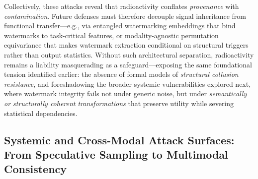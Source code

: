 \documentclass[11pt,a4paper]{article}
\begin{document}
Collectively, these attacks reveal that radioactivity conflates \emph{provenance} with \emph{contamination}. Future defenses must therefore decouple signal inheritance from functional transfer---e.g., via entangled watermarking embeddings \cite{arxiv:2002.12200} that bind watermarks to task-critical features, or modality-agnostic permutation equivariance \cite{arxiv:1910.12366} that makes watermark extraction conditional on structural triggers rather than output statistics. Without such architectural separation, radioactivity remains a liability masquerading as a safeguard---exposing the same foundational tension identified earlier: the absence of formal models of \emph{structural collusion resistance}, and foreshadowing the broader systemic vulnerabilities explored next, where watermark integrity fails not under generic noise, but under \emph{semantically or structurally coherent transformations} that preserve utility while severing statistical dependencies.


\subsection{Systemic and Cross-Modal Attack Surfaces: From Speculative Sampling to Multimodal Consistency}
\end{document}

